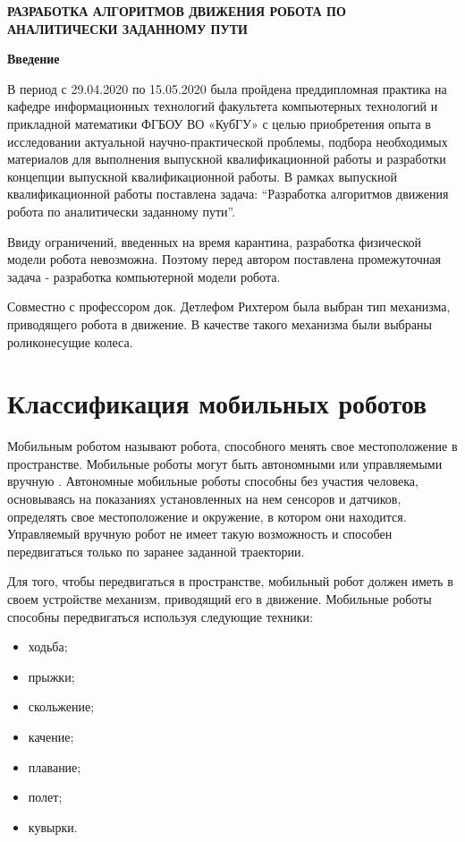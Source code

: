 \documentclass[oneside,final,14pt]{extreport}
\begin{document}
\begin{center}
\bfseries РАЗРАБОТКА АЛГОРИТМОВ ДВИЖЕНИЯ РОБОТА ПО АНАЛИТИЧЕСКИ ЗАДАННОМУ ПУТИ

\bfseries Введение
\end{center}


В период с 29.04.2020 по 15.05.2020 была пройдена преддипломная практика на кафедре информационных технологий факультета компьютерных технологий и прикладной математики ФГБОУ ВО «КубГУ» с целью приобретения опыта в исследовании актуальной научно-практической проблемы, подбора необходимых материалов для выполнения выпускной квалификационной работы и разработки концепции выпускной квалификационной работы.
В рамках выпускной квалификационной работы поставлена задача: “Разработка алгоритмов движения робота по аналитически заданному пути”.  

Ввиду ограничений, введенных на время карантина, разработка физической модели робота невозможна. Поэтому перед автором поставлена промежуточная задача - разработка компьютерной модели робота.

Совместно с профессором док. Детлефом Рихтером была выбран тип механизма, приводящего робота в движение. В качестве такого механизма были выбраны роликонесущие колеса. 


\chapter{Классификация мобильных роботов}
Мобильным роботом называют робота, способного менять свое местоположение в пространстве. Мобильные роботы могут быть автономными или управляемыми вручную \cite{Src:Siegwart}. Автономные мобильные роботы способны без участия человека, основываясь на показаниях установленных на нем сенсоров и датчиков, определять свое местоположение и окружение, в котором они находится. Управляемый вручную робот не имеет такую возможность и способен передвигаться только по заранее заданной траектории.

 
Для того, чтобы передвигаться в пространстве, мобильный робот должен иметь в своем устройстве механизм, приводящий его в движение. Мобильные роботы способны передвигаться используя следующие техники:
\begin{itemize}
\item ходьба;
\item прыжки;
\item скольжение;
\item качение;
\item плавание;
\item полет;
\item кувырки.
\end{itemize}
\end{document}
